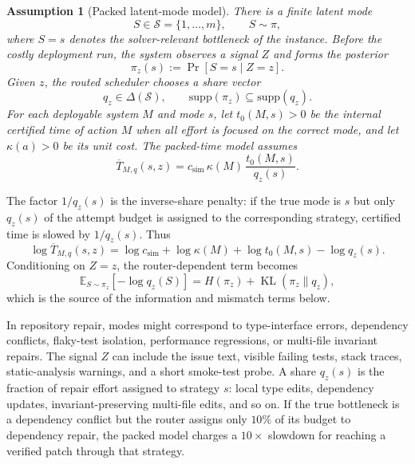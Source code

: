 \documentclass{article}
\newtheorem{assumption}{Assumption}
\DeclareMathOperator{\KL}{KL}
\newcommand{\cS}{\mathcal{S}}
\newcommand{\E}{\mathbb{E}}
\begin{document}
\begin{assumption}[Packed latent-mode model]
\label{ass:packed}
There is a finite latent mode
\[
    S\in\cS=\{1,\ldots,m\},\qquad S\sim\pi,
\]
where \(S=s\) denotes the solver-relevant bottleneck of the instance.
Before the costly deployment run, the system observes a signal \(Z\) and forms the posterior
\[
    \pi_z(s):=\Pr[S=s\mid Z=z].
\]
Given \(z\), the routed scheduler chooses a share vector
\[
    q_z\in\Delta(\cS),
    \qquad
    \mathrm{supp}(\pi_z)\subseteq \mathrm{supp}(q_z).
\]
For each deployable system \(M\) and mode \(s\), let \(t_0(M,s)>0\) be the internal certified time of action \(M\) when all effort is focused on the correct mode, and let \(\kappa(a)>0\) be its unit cost.
The packed-time model assumes
\[
    \overline T_{M,q}(s,z)
    =
    c_{\mathrm{sim}}\,
    \kappa(M)\,
    \frac{t_0(M,s)}{q_z(s)} .
\]
\end{assumption}
The factor \(1/q_z(s)\) is the inverse-share penalty: if the true mode is \(s\) but only
\(q_z(s)\) of the attempt budget is assigned to the corresponding strategy, certified time is slowed by \(1/q_z(s)\).
Thus
\[
    \log \overline T_{M,q}(s,z)
    =
    \log c_{\mathrm{sim}}+\log\kappa(M)+\log t_0(M,s)-\log q_z(s).
\]
Conditioning on \(Z=z\), the router-dependent term becomes
\[
    \E_{S\sim\pi_z}[-\log q_z(S)]
    =
    H(\pi_z)+\KL(\pi_z\|q_z),
\]
which is the source of the information and mismatch terms below.

In repository repair, modes might correspond to type-interface errors, dependency conflicts, flaky-test isolation, performance regressions, or multi-file invariant repairs.
The signal \(Z\) can include the issue text, visible failing tests, stack traces, static-analysis warnings, and a short smoke-test probe.
A share \(q_z(s)\) is the fraction of repair effort assigned to strategy \(s\): local type edits, dependency updates, invariant-preserving multi-file edits, and so on.
If the true bottleneck is a dependency conflict but the router assigns only \(10\%\) of its budget to dependency repair, the packed model charges a \(10\times\) slowdown for reaching a verified patch through that strategy.

\end{document}

